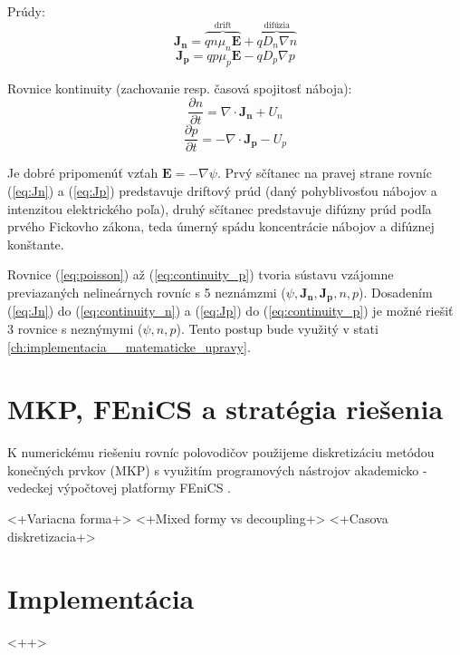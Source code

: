\documentclass[a4paper, twoside, 12pt, onecolumn]{article}
\newcommand{\dxdtp}[2]{\frac{\partial #1}{\partial #2}}
\begin{document}
Prúdy:
\begin{equation}
	\mathbf{J_n} = \overbrace{q n \mu_n \mathbf{E}}^\text{drift} + \overbrace{q D_n \nabla n}^\text{difúzia}
	\label{eq:Jn}
\end{equation}
\begin{equation}
	\mathbf{J_p} = q p \mu_p \mathbf{E} - q D_p \nabla p
	\label{eq:Jp}
\end{equation}

Rovnice kontinuity (zachovanie resp. časová spojitosť náboja):
\begin{equation}
	\dxdtp{n}{t} = \nabla \cdot \mathbf{J_n} + U_n
	\label{eq:continuity_n}
\end{equation}
\begin{equation}
	\dxdtp{p}{t} = -\nabla \cdot \mathbf{J_p} - U_p
	\label{eq:continuity_p}
\end{equation}

Je dobré pripomenúť vzťah $\mathbf{E} = - \nabla \psi$. Prvý sčítanec na pravej strane rovníc (\ref{eq:Jn}) a (\ref{eq:Jp}) predstavuje driftový prúd (daný pohyblivosťou nábojov a intenzitou elektrického poľa), druhý sčítanec predstavuje difúzny prúd podľa prvého Fickovho zákona, teda úmerný spádu koncentrácie nábojov a difúznej konštante.

Rovnice (\ref{eq:poisson}) až (\ref{eq:continuity_p}) tvoria sústavu vzájomne previazaných nelineárnych rovníc s 5 neznámzmi ($\psi, \mathbf{J_n}, \mathbf{J_p}, n, p$). Dosadením (\ref{eq:Jn}) do (\ref{eq:continuity_n}) a (\ref{eq:Jp}) do (\ref{eq:continuity_p}) je možné riešiť 3 rovnice s neznýmymi ($\psi, n, p$). Tento postup bude využitý v stati \ref{ch:implementacia__matematicke_upravy}.


\section{MKP, FEniCS a stratégia riešenia}
K numerickému riešeniu rovníc polovodičov použijeme diskretizáciu metódou konečných prvkov (MKP) s využitím programových nástrojov akademicko - vedeckej výpočtovej platformy FEniCS \cite{fenicsproject}.

<+Variacna forma+>
<+Mixed formy vs decoupling+>
<+Casova diskretizacia+>

\section{Implementácia}<++>
\end{document}
